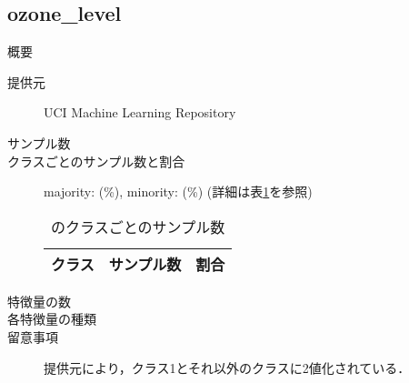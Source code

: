 \subsection{ozone\_level}
\begin{description}
    \item[概要] \cite{}
    \item[提供元] UCI Machine Learning Repository
    \item[サンプル数] 
    \item[クラスごとのサンプル数と割合] majority:  (\%), minority:  (\%) (詳細は表\ref{tab:}を参照)

        \begin{table}[htbp]
            \centering
            \caption{のクラスごとのサンプル数}
            \label{tab:}
            \begin{tabular}{lrc} \hline
                \multicolumn{1}{c}{クラス}&
                \multicolumn{1}{c}{サンプル数}&
                \multicolumn{1}{c}{割合}\\
                \hline
                \hline

                \hline
            \end{tabular}
        \end{table}

    \item[特徴量の数] 
    \item[各特徴量の種類] \mbox{}
        
    \item[留意事項] 提供元により，クラス1とそれ以外のクラスに2値化されている．
\end{description}


